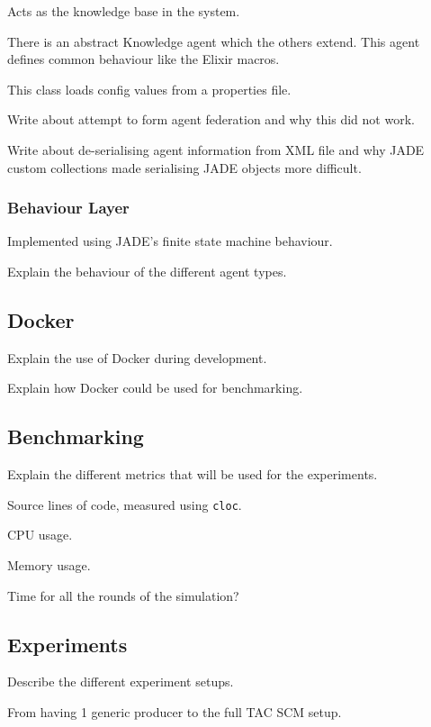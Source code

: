 Acts as the knowledge base in the system.

There is an abstract Knowledge agent which the others extend.
This agent defines common behaviour like the Elixir macros.

This class loads config values from a properties file.

Write about attempt to form agent federation and why this did not work.

Write about de-serialising agent information from XML file and why JADE custom collections made serialising JADE objects more difficult.

\subsubsection{Behaviour Layer}

Implemented using JADE's finite state machine behaviour.

Explain the behaviour of the different agent types.

\subsection{Docker}

Explain the use of Docker during development.

Explain how Docker could be used for benchmarking.

\subsection{Benchmarking}

Explain the different metrics that will be used for the experiments.

Source lines of code, measured using \verb|cloc|.

CPU usage.

Memory usage.

Time for all the rounds of the simulation?

\subsection{Experiments}

Describe the different experiment setups.

From having 1 generic producer to the full TAC SCM setup.

